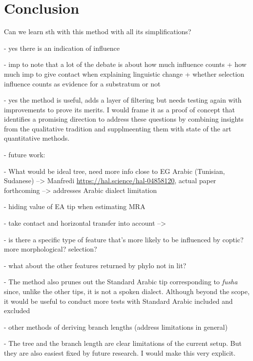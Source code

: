 \documentclass[12pt,a4paper]{article}
\begin{document}
     
\section{Conclusion}
\label{sec:conclusion}

Can we learn sth with this method with all its simplifications? 

- yes there is an indication of influence

- imp to note that a lot of the debate is about how much influence counts + how much imp to give contact when explaining linguistic change + whether selection influence counts as evidence for a substratum or not

- yes the method is useful, adds a layer of filtering but needs testing again with improvements to prove its merits. I would frame it as a proof of concept that identifies a promising direction to address these questions by combining insights from the qualitative tradition and supplmeenting them with state of the art quantitative methods.

- future work:
    
    - What would be ideal tree, need more info close to EG Arabic (Tunisian, Sudanese) --> Manfredi \url{https://hal.science/hal-04858120}, actual paper forthcoming --> addresses Arabic dialect limitation

    - hiding value of EA tip when estimating MRA
    
    - take contact and horizontal transfer into account --> \parencite{neureiter_detecting_2022}

    - is there a specific type of feature that's more likely to be influenced by coptic? more morphological? selection?

    - what about the other features returned by phylo not in lit?

    - The method also prunes out the Standard Arabic tip corresponding to \textit{fusha} since, unlike the other tips, it is not a spoken dialect. Although beyond the scope, it would be useful to conduct more tests with Standard Arabic included and excluded 

    - other methods of deriving branch lengths (address limitations in general)

    - The tree and the branch length are clear limitations of the current setup. But they are also easiest fixed by future research. I would make this very explicit.

\newpage

\printbibliography
\end{document}
